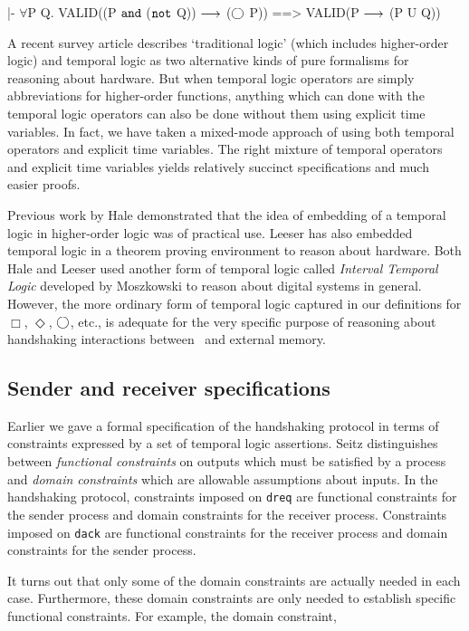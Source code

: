 \begintt
|- \(\forall\)P Q. VALID((P \(\tt{and}\) (\(\tt{not}\) Q)) \(\longrightarrow\) (\(\bigcirc\) P)) ==> VALID(P \(\longrightarrow\) (P U Q))
\endtt

A recent survey article
\cite{Camurati} describes `traditional logic' (which includes
higher-order logic) and temporal logic as two alternative kinds
of pure formalisms for reasoning about hardware.
But when
temporal logic operators are
simply abbreviations for higher-order functions,
anything which can done with the temporal logic operators
can also be done without them using explicit time variables.
In fact, we have taken a mixed-mode approach of using both
temporal operators and explicit time variables.
The right mixture of temporal operators and explicit time variables
yields relatively succinct specifications and much easier proofs.

Previous work by Hale \cite{Hale:thesis} demonstrated that
the idea of embedding of a temporal logic
in higher-order logic was of practical use.
Leeser \cite{Leeser:thesis} has also embedded temporal logic in
a theorem proving environment to reason about hardware.
Both Hale and Leeser used another form of temporal logic called
{\it Interval Temporal Logic} developed by Moszkowski
\cite{Moszkowski:thesis,Moszkowski:journal}
to reason about digital systems in general.
However, the more ordinary form of temporal logic
captured in our definitions for $\Box$, $\Diamond$, $\bigcirc$, etc.,
is adequate for the very specific purpose
of reasoning about
handshaking interactions between \Tamarack\ and
external memory.

\subsection{Sender and receiver specifications}

Earlier we gave a formal specification of the handshaking protocol
in terms of constraints
expressed by a set of temporal logic assertions.
Seitz \cite{Seitz} distinguishes between {\it functional constraints}
on outputs which must
be satisfied by a process and {\it domain constraints}
which are allowable assumptions about inputs.
In the handshaking protocol,
constraints imposed on \verb"dreq" are functional constraints
for the sender process and domain constraints for the
receiver process.
Constraints imposed on \verb"dack" are functional constraints
for the receiver process and domain constraints for the
sender process.

It turns out that only some of the domain constraints are
actually needed in each case.
Furthermore, 
these domain constraints are only needed to establish specific
functional constraints.
For example, the domain constraint,


